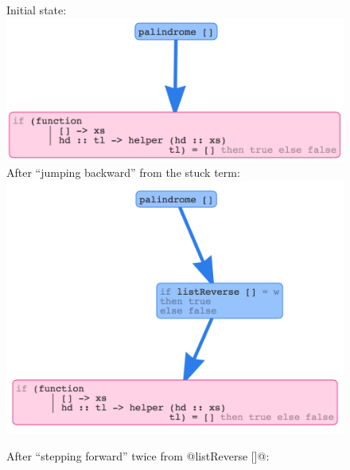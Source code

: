 \begin{figure}[ht]
\centering
\begin{minipage}{0.49\linewidth}
Initial state: \\
\includegraphics[width=\linewidth]{palindrome} \\
After ``jumping backward'' from the stuck term: \\
\includegraphics[width=\linewidth]{palindrome2}
\end{minipage}
\begin{minipage}{0.49\linewidth}
After ``stepping forward'' twice from @listReverse []@: \\

\end{minipage}
\end{figure}
